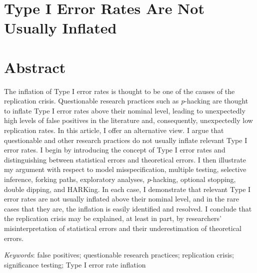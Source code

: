 \documentclass[authordate, empirical]{jote-new-article}
\author[1]{\mbox{Mark Rubin\orcid{0000-0002-6483-8561}}}
\affil[1]{Durham University}
\begin{document}
\begin{frontmatter}
  \maketitle
  \begin{abstract}
    \printabstracttext
  \end{abstract}
\end{frontmatter}


	\section{\textbf{Type I Error Rates Are Not Usually Inflated}}



	\section{\textbf{Abstract}}



	The inflation of Type I error rates is thought to be one of the causes of the replication crisis. Questionable research practices such as \emph{p}-hacking are thought to inflate Type I error rates above their nominal level, leading to unexpectedly high levels of false positives in the literature and, consequently, unexpectedly low replication rates. In this article, I offer an alternative view. I argue that questionable and other research practices do not usually inflate relevant Type I error rates. I begin by introducing the concept of Type I error rates and distinguishing between statistical errors and theoretical errors. I then illustrate my argument with respect to model misspecification, multiple testing, selective inference, forking paths, exploratory analyses, \emph{p}-hacking, optional stopping, double dipping, and HARKing. In each case, I demonstrate that relevant Type I error rates are not usually inflated above their nominal level, and in the rare cases that they are, the inflation is easily identified and resolved. I conclude that the replication crisis may be explained, at least in part, by researchers' misinterpretation of statistical errors and their underestimation of theoretical errors.







	\emph{Keywords}: false positives; questionable research practices; replication crisis; significance testing; Type I error rate inflation
\end{document}
